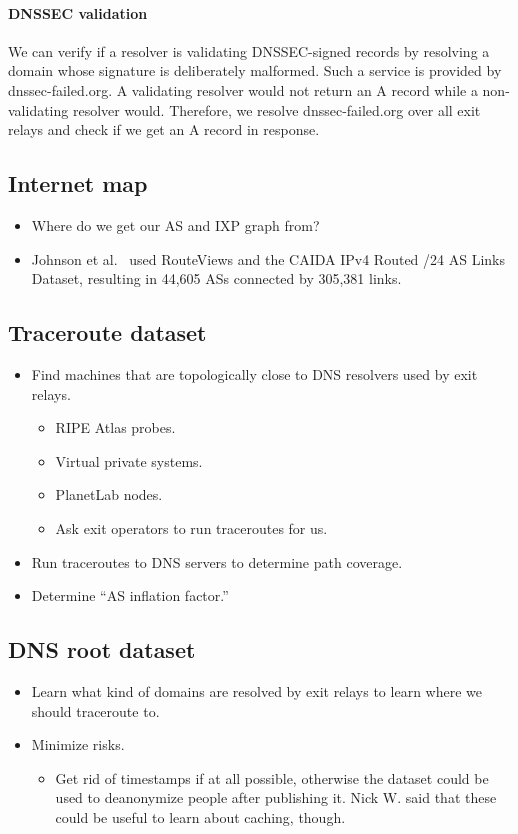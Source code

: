 \paragraph{DNSSEC validation}
We can verify if a resolver is validating DNSSEC-signed records by resolving a
domain whose signature is deliberately malformed.  Such a service is provided by
dnssec-failed.org.  A validating resolver would not return an A record while a
non-validating resolver would.  Therefore, we resolve dnssec-failed.org over all
exit relays and check if we get an A record in response.

\subsection{Internet map}
\begin{itemize}
	\item Where do we get our AS and IXP graph from?
	\item Johnson et al.~\cite[\S 5.2]{Johnson2013a} used RouteViews and the CAIDA IPv4
		Routed /24 AS Links Dataset, resulting in 44,605 ASs connected by
		305,381 links.
\end{itemize}

\subsection{Traceroute dataset}
\label{sec:traceroute-dataset}
\begin{itemize}
	\item Find machines that are topologically close to DNS resolvers
		used by exit relays.
	\begin{itemize}
		\item RIPE Atlas probes.
		\item Virtual private systems.
		\item PlanetLab nodes.
		\item Ask exit operators to run traceroutes for us.
	\end{itemize}
	\item Run traceroutes to DNS servers to determine path coverage.
	\item Determine ``AS inflation factor.''
\end{itemize}

\subsection{DNS root dataset}
\label{sec:dns-root-dataset}
\begin{itemize}
	\item Learn what kind of domains are resolved by exit relays to learn where
		we should traceroute to.
	\item Minimize risks.
	\begin{itemize}
		\item Get rid of timestamps if at all possible, otherwise the dataset
			could be used to deanonymize people after publishing it.  Nick W.
			said that these could be useful to learn about caching, though.
	\end{itemize}
\end{itemize}

